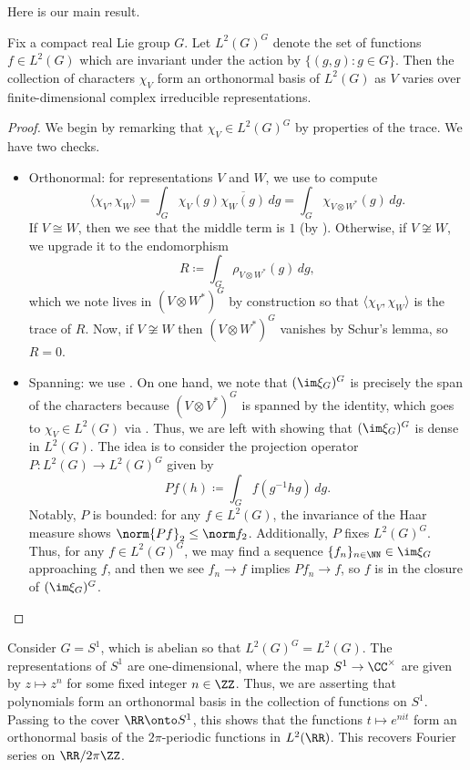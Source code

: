 \documentclass{amsart}
\begin{document}
Here is our main result.
\begin{theorem} \label{thm:char-ortho}
	Fix a compact real Lie group $G$. Let $L^2(G)^G$ denote the set of functions $f\in L^2(G)$ which are invariant under the action by $\{(g,g):g\in G\}$. Then the collection of characters $\chi_V$ form an orthonormal basis of $L^2(G)$ as $V$ varies over finite-dimensional complex irreducible representations.
\end{theorem}
\begin{proof}
	We begin by remarking that $\chi_V\in L^2(G)^G$ by properties of the trace. We have two checks.
	\begin{itemize}
		\item Orthonormal: for representations $V$ and $W$, we use  to compute
		\[\langle\chi_V,\chi_W\rangle=\int_G\chi_V(g)\overline{\chi_W(g)}\,dg=\int_G\chi_{V\otimes W^*}(g)\,dg.\]
		If $V\cong W$, then we see that the middle term is $1$ (by ). Otherwise, if $V\not\cong W$, we upgrade it to the endomorphism
		\[R\coloneqq\int_G\rho_{V\otimes W^*}(g)\,dg,\]
		which we note lives in $(V\otimes W^*)^G$ by construction so that $\langle\chi_V,\chi_W\rangle$ is the trace of $R$. Now, if $V\not\cong W$ then $(V\otimes W^*)^G$ vanishes by Schur's lemma, so $R=0$.
		\item Spanning: we use . On one hand, we note that $(\im\xi_G)^G$ is precisely the span of the characters because $(V\otimes V^*)^G$ is spanned by the identity, which goes to $\chi_V\in L^2(G)$ via . Thus, we are left with showing that $(\im\xi_G)^G$ is dense in $L^2(G)$. The idea is to consider the projection operator $P\colon L^2(G)\to L^2(G)^G$ given by
		\[Pf(h)\coloneqq\int_Gf\left(g^{-1}hg\right)\,dg.\]
		Notably, $P$ is bounded: for any $f\in L^2(G)$, the invariance of the Haar measure shows $\norm{Pf}_2\le\norm f_2$. Additionally, $P$ fixes $L^2(G)^G$. Thus, for any $f\in L^2(G)^G$, we may find a sequence $\{f_n\}_{n\in\NN}\in\im\xi_G$ approaching $f$, and then we see $f_n\to f$ implies $Pf_n\to f$, so $f$ is in the closure of $(\im\xi_G)^G$.
		\qedhere
	\end{itemize}
\end{proof}
\begin{example}
	Consider $G=S^1$, which is abelian so that $L^2(G)^G=L^2(G)$. The representations of $S^1$ are one-dimensional, where the map $S^1\to\CC^\times$ are given by $z\mapsto z^n$ for some fixed integer $n\in\ZZ$. Thus, we are asserting that polynomials form an orthonormal basis in the collection of functions on $S^1$. Passing to the cover $\RR\onto S^1$, this shows that the functions $t\mapsto e^{nit}$ form an orthonormal basis of the $2\pi$-periodic functions in $L^2(\RR)$. This recovers Fourier series on $\RR/2\pi\ZZ$.
\end{example}
\end{document}
